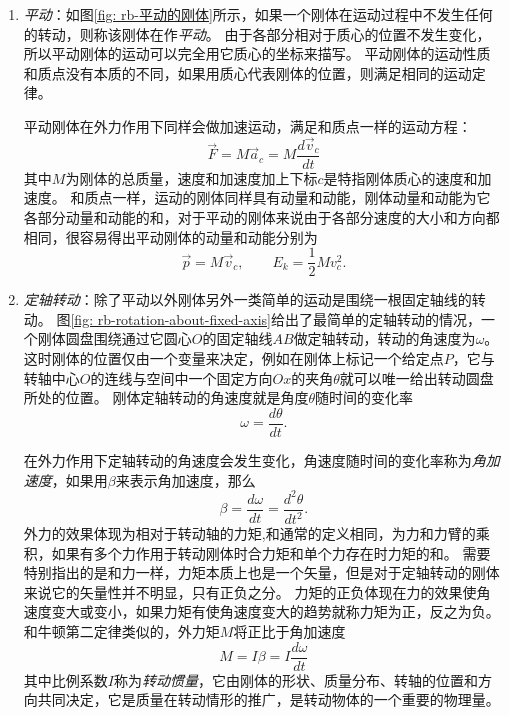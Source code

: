 \begin{enumerate}
\item \emph{平动}：如图\ref{fig: rb-平动的刚体}所示，如果一个刚体在运动过程中不发生任何的转动，则称该刚体在作\emph{平动}。
由于各部分相对于质心的位置不发生变化，所以平动刚体的运动可以完全用它质心的坐标来描写。
平动刚体的运动性质和质点没有本质的不同，如果用质心代表刚体的位置，则满足相同的运动定律。

平动刚体在外力作用下同样会做加速运动，满足和质点一样的运动方程：
\begin{equation}
\vec{F} = M\vec{a}_c =M\frac{d\vec{v}_c}{dt} 
\end{equation}
其中$M$为刚体的总质量，速度和加速度加上下标$c$是特指刚体质心的速度和加速度。
和质点一样，运动的刚体同样具有动量和动能，刚体动量和动能为它各部分动量和动能的和，对于平动的刚体来说由于各部分速度的大小和方向都相同，很容易得出平动刚体的动量和动能分别为
\begin{equation}
\vec{p} = M\vec{v}_c,\qquad E_k = \frac{1}{2}Mv_c^2.
\end{equation}

\item \emph{定轴转动}：除了平动以外刚体另外一类简单的运动是围绕一根固定轴线的转动。
图\ref{fig: rb-rotation-about-fixed-axis}给出了最简单的定轴转动的情况，一个刚体圆盘围绕通过它圆心$O$的固定轴线$AB$做定轴转动，转动的角速度为$\omega$。
这时刚体的位置仅由一个变量来决定，例如在刚体上标记一个给定点$P$，它与转轴中心$O$的连线与空间中一个固定方向$Ox$的夹角$\theta$就可以唯一给出转动圆盘所处的位置。
刚体定轴转动的角速度就是角度$\theta$随时间的变化率
\begin{equation}
\omega=\frac{d\theta}{dt}.
\end{equation}



在外力作用下定轴转动的角速度会发生变化，角速度随时间的变化率称为\emph{角加速度}，如果用$\beta$来表示角加速度，那么
\begin{equation}
\beta = \frac{d\omega}{dt} = \frac{d^2\theta}{dt^2}.
\end{equation}
外力的效果体现为相对于转动轴的力矩,和通常的定义相同，为力和力臂的乘积，如果有多个力作用于转动刚体时合力矩和单个力存在时力矩的和。
需要特别指出的是和力一样，力矩本质上也是一个矢量，但是对于定轴转动的刚体来说它的矢量性并不明显，只有正负之分。
力矩的正负体现在力的效果使角速度变大或变小，如果力矩有使角速度变大的趋势就称力矩为正，反之为负。
和牛顿第二定律类似的，外力矩$M$将正比于角加速度
\begin{equation}\label{eqn: rb-刚体转动定律}
M = I\beta=I\frac{d\omega}{dt}
\end{equation}
其中比例系数$I$称为\emph{转动惯量}，它由刚体的形状、质量分布、转轴的位置和方向共同决定，它是质量在转动情形的推广，是转动物体的一个重要的物理量。


\end{enumerate}
